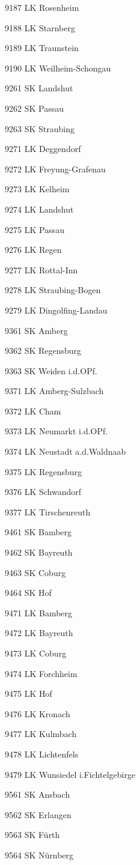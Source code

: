9187  LK Rosenheim

9188  LK Starnberg

9189  LK Traunstein

9190  LK Weilheim-Schongau

9261  SK Landshut

9262  SK Passau

9263  SK Straubing

9271  LK Deggendorf

9272  LK Freyung-Grafenau

9273  LK Kelheim

9274  LK Landshut

9275  LK Passau

9276  LK Regen

9277  LK Rottal-Inn

9278  LK Straubing-Bogen

9279  LK Dingolfing-Landau

9361  SK Amberg

9362  SK Regensburg

9363  SK Weiden i.d.OPf.

9371  LK Amberg-Sulzbach

9372  LK Cham

9373  LK Neumarkt i.d.OPf.

9374  LK Neustadt a.d.Waldnaab

9375  LK Regensburg

9376  LK Schwandorf

9377  LK Tirschenreuth

9461  SK Bamberg

9462  SK Bayreuth

9463  SK Coburg

9464  SK Hof

9471  LK Bamberg

9472  LK Bayreuth

9473  LK Coburg

9474  LK Forchheim

9475  LK Hof

9476  LK Kronach

9477  LK Kulmbach

9478  LK Lichtenfels

9479  LK Wunsiedel i.Fichtelgebirge

9561  SK Ansbach

9562  SK Erlangen

9563  SK Fürth

9564  SK Nürnberg

